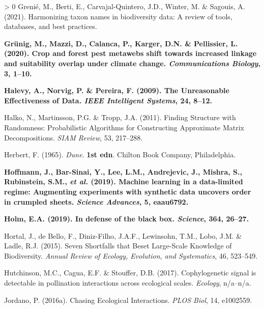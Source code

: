 \documentclass[11pt]{article}
\makeatletter
\def\maxwidth{\ifdim\Gin@nat@width>\linewidth\linewidth
\else\Gin@nat@width\fi}
\let\Oldincludegraphics\includegraphics
\renewcommand{\includegraphics}[1]{\Oldincludegraphics[width=\maxwidth]{#1}}
\newlength{\cslhangindent}
\newenvironment{CSLReferences}[3] %
 {%
  \setlength{\parindent}{0pt}
  \ifodd #1 \everypar{\setlength{\hangindent}{\cslhangindent}}\ignorespaces\fi
  \ifnum #2 > 0
  \setlength{\parskip}{#2\baselineskip}
  \fi
 }%
 {}
\providecommand{\DIFaddtex}[1]{{\bf #1}} %
\providecommand{\DIFdeltex}[1]{} %
\providecommand{\DIFaddbegin}{\protect\color{blue}} %
\providecommand{\DIFaddend}{\protect\color{black}} %
\providecommand{\DIFdelbegin}{\protect\color{red}} %
\providecommand{\DIFdelend}{\protect\color{black}} %
\providecommand{\DIFadd}[1]{\texorpdfstring{\DIFaddtex{#1}}{#1}} %
\providecommand{\DIFdel}[1]{\texorpdfstring{\DIFdeltex{#1}}{}} %
\newcommand{\DIFscaledelfig}{0.5}
\newlength{\DIFdelgraphicswidth} %
\newlength{\DIFdelgraphicsheight} %
\newcommand{\DIFaddincludegraphics}[2][]{{\color{blue}\fbox{\DIFOincludegraphics[#1]{#2}}}} %
\newcommand{\DIFdelincludegraphics}[2][]{%
\sbox{\DIFdelgraphicsbox}{\DIFOincludegraphics[#1]{#2}}%
\settoboxwidth{\DIFdelgraphicswidth}{\DIFdelgraphicsbox} %
\settoboxtotalheight{\DIFdelgraphicsheight}{\DIFdelgraphicsbox} %
\scalebox{\DIFscaledelfig}{%
\parbox[b]{\DIFdelgraphicswidth}{\usebox{\DIFdelgraphicsbox}\\[-\baselineskip] \rule{\DIFdelgraphicswidth}{0em}}\llap{\resizebox{\DIFdelgraphicswidth}{\DIFdelgraphicsheight}{%
\setlength{\unitlength}{\DIFdelgraphicswidth}%
\begin{picture}(1,1)%
\thicklines\linethickness{2pt} %
{\color[rgb]{1,0,0}\put(0,0){\framebox(1,1){}}}%
{\color[rgb]{1,0,0}\put(0,0){\line( 1,1){1}}}%
{\color[rgb]{1,0,0}\put(0,1){\line(1,-1){1}}}%
\end{picture}%
}\hspace*{3pt}}} %
} %
\DeclareRobustCommand{\DIFaddbegin}{\DIFOaddbegin \let\includegraphics\DIFaddincludegraphics} %
\DeclareRobustCommand{\DIFaddend}{\DIFOaddend \let\includegraphics\DIFOincludegraphics} %
\DeclareRobustCommand{\DIFdelbegin}{\DIFOdelbegin \let\includegraphics\DIFdelincludegraphics} %
\DeclareRobustCommand{\DIFdelend}{\DIFOaddend \let\includegraphics\DIFOincludegraphics} %
\makeatother
\begin{document}
\begin{CSLReferences}{1}{0}
\leavevmode\DIFaddend \hypertarget{ref-Grenie2021HarTax}{}%
Grenié, M., Berti, E., Carvajal-Quintero, J.D., Winter, M. \& Sagouis,
A. (2021). Harmonizing taxon names in biodiversity data: A review of
tools, databases, and best practices.

\leavevmode\DIFaddbegin \hypertarget{ref-Grunig2020CroFor}{}%
\DIFadd{Grünig, M., Mazzi, D., Calanca, P., Karger, D.N. \& Pellissier, L.
(2020). Crop and forest pest metawebs shift towards increased linkage
and suitability overlap under climate change. \emph{Communications
Biology}, 3, 1--10.
}

\leavevmode\hypertarget{ref-Halevy2009UnrEff}{}%
\DIFadd{Halevy, A., Norvig, P. \& Pereira, F. (2009). The Unreasonable
Effectiveness of Data. \emph{IEEE Intelligent Systems}, 24, 8--12.
}

\leavevmode\DIFaddend \hypertarget{ref-Halko2011FinStr}{}%
Halko, N., Martinsson, P.G. \& Tropp, J.A. (2011). Finding Structure
with Randomness: Probabilistic Algorithms for Constructing Approximate
Matrix Decompositions. \emph{SIAM Review}, 53, 217--288.

\leavevmode\hypertarget{ref-Herbert1965Dun}{}%
Herbert, F. (1965). \emph{Dune}. \DIFdelbegin \DIFdel{First}\DIFdelend \DIFaddbegin \DIFadd{1st edn}\DIFaddend . Chilton Book Company,
Philadelphia.

\leavevmode\DIFaddbegin \hypertarget{ref-Hoffmann2019MacLea}{}%
\DIFadd{Hoffmann, J., Bar-Sinai, Y., Lee, L.M., Andrejevic, J., Mishra, S.,
Rubinstein, S.M., \emph{et al.} (2019). Machine learning in a
data-limited regime: Augmenting experiments with synthetic data uncovers
order in crumpled sheets. \emph{Science Advances}, 5, eaau6792.
}

\leavevmode\hypertarget{ref-Holm2019DefBla}{}%
\DIFadd{Holm, E.A. (2019). In defense of the black box. \emph{Science}, 364,
26--27.
}

\leavevmode\DIFaddend \hypertarget{ref-Hortal2015SevSho}{}%
Hortal, J., de Bello, F., Diniz-Filho, J.A.F., Lewinsohn, T.M., Lobo,
J.M. \& Ladle, R.J. (2015). Seven Shortfalls that Beset Large-Scale
Knowledge of Biodiversity. \emph{Annual Review of Ecology, Evolution,
and Systematics}, 46, 523--549.

\leavevmode\hypertarget{ref-Hutchinson2017CopSig}{}%
Hutchinson, M.C., Cagua, E.F. \& Stouffer, D.B. (2017). Cophylogenetic
signal is detectable in pollination interactions across ecological
scales. \emph{Ecology}, n/a--n/a.

\leavevmode\hypertarget{ref-Jordano2016ChaEco}{}%
Jordano, P. (2016a). Chasing Ecological Interactions. \emph{PLOS Biol},
14, e1002559.


\end{CSLReferences}
\end{document}
